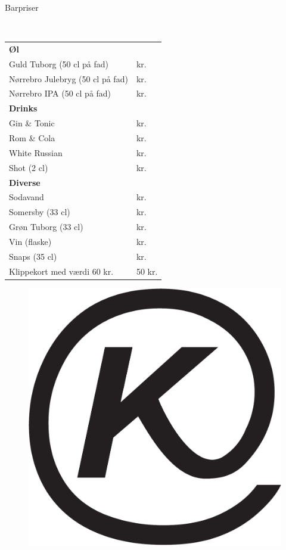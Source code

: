 \begin{flushleft}
\begin{huge}
Barpriser
\end{huge}
\\[.1cm]
\begin{table}[h!]
\begin{tabular}{p{} p{}}
\textbf{Øl} & \\
Guld Tuborg (50 cl på fad) &  kr.\\
Nørrebro Julebryg (50 cl på fad) &  kr.\\
Nørrebro IPA (50 cl på fad) &  kr.\\[2ex]
\textbf{Drinks} & \\
Gin \& Tonic & kr.\\
Rom \& Cola & kr.\\
White Russian & kr.\\
Shot (2 cl) & kr.\\[2ex]
\textbf{Diverse} & \\
Sodavand &  kr.\\
Somersby (33 cl) &  kr. \\
Grøn Tuborg (33 cl) &  kr.\\
Vin (flaske) &  kr.\\
Snaps (35 cl) &  kr.\\
Klippekort med værdi 60 kr. & 50 kr.\\
\end{tabular}
\end{table}
\end{flushleft}
\begin{figure}[h!]
    \begin{center}
    \includegraphics[width=.45\linewidth]{../logo.pdf}
\end{center}
\end{figure}
